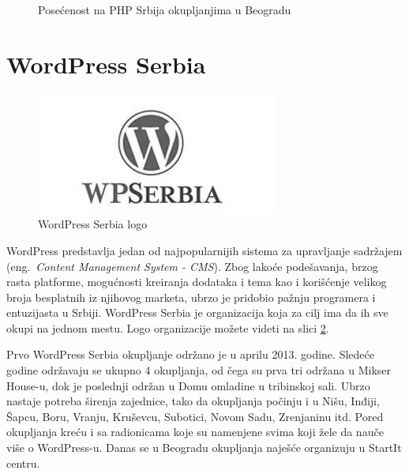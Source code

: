 \documentclass[a4paper]{article}
\begin{document}
{\begin{figure}
\centering
{}
\caption{Posećenost na PHP Srbija okupljanjima u Beogradu}
\label{fig:PHPgrafik}
\end{figure}

\section{WordPress Serbia}
\begin{figure}[h!]
\begin{center}
\includegraphics[scale=0.5]{wp.jpg}
\end{center}
\caption{WordPress Serbia logo}
\label{fig:wordpressLogo}
\end{figure}
WordPress predstavlja jedan od najpopularnijih sistema za upravljanje sadržajem (eng.~{\em Content Management System - CMS}). Zbog lakoće podešavanja, brzog rasta platforme, mogućnosti kreiranja dodataka i tema kao i korišćenje velikog broja besplatnih iz njihovog marketa, ubrzo je pridobio pažnju programera i entuzijasta u Srbiji. WordPress Serbia je organizacija koja za cilj ima da ih sve okupi na jednom mestu. Logo organizacije možete videti na slici \ref{fig:wordpressLogo}.

Prvo WordPress Serbia okupljanje održano je u aprilu 2013. godine. Sledeće godine održavaju se ukupno 4 okupljanja, od čega su prva tri održana u Mikser House-u, dok je poslednji održan u Domu omladine u tribinskoj sali. Ubrzo nastaje potreba širenja zajednice, tako da okupljanja počinju i u Nišu, Inđiji, Šapcu, Boru, Vranju, Kruševcu, Subotici, Novom Sadu, Zrenjaninu itd. Pored okupljanja kreću i sa radionicama koje su namenjene svima koji žele da nauče više o WordPress-u. Danas se u Beogradu okupljanja naješće organizuju u StartIt centru.

}
\end{document}
